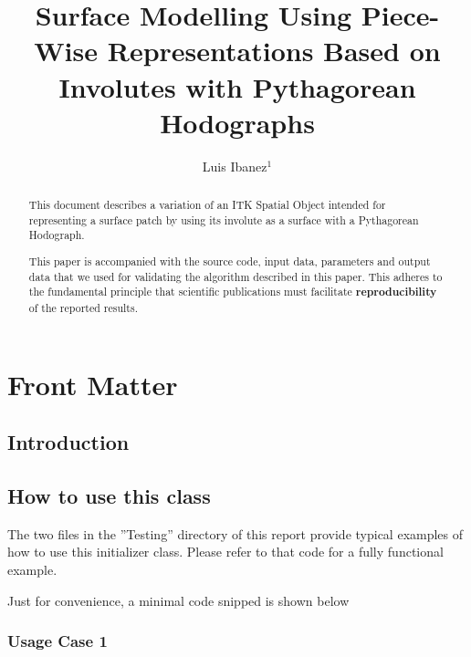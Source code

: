 \documentclass{InsightArticle}
\title{Surface Modelling Using Piece-Wise Representations Based on Involutes
with Pythagorean Hodographs}
\author{Luis Ibanez$^{1}$}
\begin{document}
\ifpdf
\else
\fi


\maketitle


\ifhtml
\chapter*{Front Matter\label{front}}
\fi


\begin{abstract}
\noindent
This document describes a variation of an ITK Spatial Object intended for
representing a surface patch by using its involute as a surface with a
Pythagorean Hodograph.

This paper is accompanied with the source code, input data, parameters and
output data that we used for validating the algorithm described in this paper.
This adheres to the fundamental principle that scientific publications must
facilitate \textbf{reproducibility} of the reported results.
\end{abstract}

\tableofcontents

\section{Introduction}



\section{How to use this class}

The two files in the ''Testing'' directory of this report provide typical
examples of how to use this initializer class. Please refer to that code for a
fully functional example.

Just for convenience, a minimal code snipped is shown below 

\subsection{Usage Case 1}
\label{sec:Case1}
\end{document}

